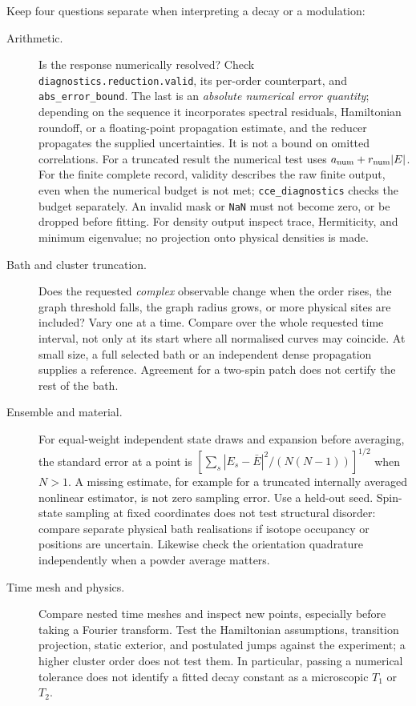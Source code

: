 \documentclass[11pt,a4paper]{article}
\newcommand{\code}[1]{\texttt{#1}}
\begin{document}
Keep four questions separate when interpreting a decay or a modulation:
\begin{description}
\item[Arithmetic.] Is the response numerically resolved? Check
\code{diagnostics.reduction.valid}, its per-order counterpart, and
\code{abs\_error\_bound}. The last is an \emph{absolute numerical
error quantity}; depending on the sequence it incorporates spectral
residuals, Hamiltonian roundoff, or a floating-point propagation
estimate, and the reducer propagates the supplied uncertainties. It is
not a bound on omitted correlations. For a truncated result the
numerical test uses $a_{\rm num}+r_{\rm num}|E|$. For the finite
complete record, validity describes the raw finite output, even when the
numerical budget is not met; \code{cce\_diagnostics} checks the budget
separately. An invalid mask or \code{NaN} must not become zero, or be
dropped before fitting. For density output inspect trace, Hermiticity,
and minimum eigenvalue; no projection onto physical densities is made.
\item[Bath and cluster truncation.] Does the requested \emph{complex}
observable change when the order rises, the graph threshold falls, the
graph radius grows, or more physical sites are included? Vary one at a
time. Compare over the whole requested time interval, not only at its
start where all normalised curves may coincide. At small size, a full
selected bath or an independent dense propagation supplies a reference.
Agreement for a two-spin patch does not certify the rest of the bath.
\item[Ensemble and material.] For equal-weight independent state draws
and expansion before averaging, the standard error at a point is
$[\sum_s |E_s-\bar E|^2/(N(N-1))]^{1/2}$ when $N>1$. A missing
estimate, for example for a truncated internally averaged nonlinear
estimator, is not zero sampling error. Use a held-out seed. Spin-state
sampling at fixed coordinates does not test structural disorder: compare
separate physical bath realisations if isotope occupancy or positions
are uncertain. Likewise check the orientation quadrature independently
when a powder average matters.
\item[Time mesh and physics.] Compare nested time meshes and inspect
new points, especially before taking a Fourier transform. Test the
Hamiltonian assumptions, transition projection, static exterior, and
postulated jumps against the experiment; a higher cluster order does
not test them. In particular, passing a numerical tolerance does not
identify a fitted decay constant as a microscopic $T_1$ or $T_2$.
\end{description}
\end{document}
